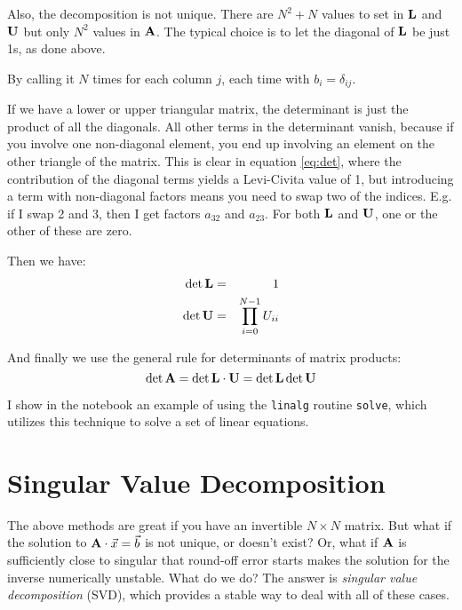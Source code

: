 Also, the decomposition is not unique. There are $N^2 + N$ values to
set in ${\bf L}$ and ${\bf U}$ but only $N^2$ values in ${\bf A}$. The
typical choice is to let the diagonal of ${\bf L}$ be just 1s, as done
above. 


\begin{answer}
By calling it $N$ times for each column $j$, each time with $b_i =
\delta_{ij}$. 
\end{answer}


\begin{answer}
If we have a lower or upper triangular matrix, the determinant is just
the product of all the diagonals. All other terms in the determinant
vanish, because if you involve one non-diagonal element, you end up
involving an element on the other triangle of the matrix. This is
clear in equation \ref{eq:det}, where the contribution of the diagonal
terms yields a Levi-Civita value of 1, but introducing a term with
non-diagonal factors means you need to swap two of the
indices. E.g. if I swap 2 and 3, then I get factors $a_{32}$ and
$a_{23}$. For both ${\bf L}$ and ${\bf U}$, one or the other of these
are zero.

Then we have:
\begin{eqnarray}
\det {\bf L} &=& 1 \cr
\det {\bf U} &=& \prod_{i=0}^{N-1} U_{ii}
\end{eqnarray}

And finally we use the general rule for determinants of matrix
products:
\begin{equation}
\det {\bf A} =  \det {\bf L}  \cdot {\bf U} = 
\det {\bf L} \det {\bf U}
\end{equation}
\end{answer}

I show in the notebook an example of using the {\tt linalg} routine
{\tt solve}, which utilizes this technique to solve a set of linear
equations. 

\section{Singular Value Decomposition}

The above methods are great if you have an invertible $N\times N$
matrix. But what if the solution to ${\bf A}\cdot \vec{x} = \vec{b}$
is not unique, or doesn't exist? Or, what if ${\bf A}$ is sufficiently
close to singular that round-off error starts makes the solution for
the inverse numerically unstable. What do we do? The answer is {\it
  singular value decomposition} (SVD), which provides a stable way to
deal with all of these cases.

